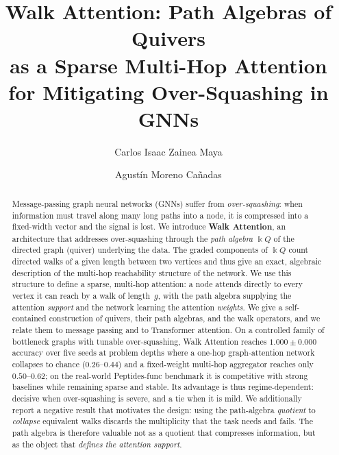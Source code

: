 \documentclass[runningheads]{llncs}
\newcommand{\kk}{\Bbbk}                 %
\newcommand{\kQ}{\kk Q}                 %
\begin{document}
\title{Walk Attention: Path Algebras of Quivers\\ as a Sparse Multi-Hop Attention\\ for Mitigating Over-Squashing in GNNs}

\author{Carlos Isaac Zainea Maya \and
Agust\'in Moreno Ca\~nadas}

\maketitle

\begin{abstract}
Message-passing graph neural networks (GNNs) suffer from \emph{over-squashing}:
when information must travel along many long paths into a node, it is compressed
into a fixed-width vector and the signal is lost. We introduce \textbf{Walk
Attention}, an architecture that addresses over-squashing through the
\emph{path algebra} $\kQ$ of the directed graph (quiver) underlying the data.
The graded components of $\kQ$ count directed walks of a given length between
two vertices and thus give an exact, algebraic description of the multi-hop
reachability structure of the network. We use this structure to define a sparse,
multi-hop attention: a node attends directly to every vertex it can reach by a
walk of length~$g$, with the path algebra supplying the attention \emph{support}
and the network learning the attention \emph{weights}. We give a self-contained
construction of quivers, their path algebras, and the walk operators, and we
relate them to message passing and to Transformer attention. On a controlled
family of bottleneck graphs with tunable over-squashing, Walk Attention reaches
$1.000 \pm 0.000$ accuracy over five seeds at problem depths where a one-hop
graph-attention network collapses to chance ($0.26$--$0.44$) and a
fixed-weight multi-hop aggregator reaches only $0.50$--$0.62$; on the real-world
Peptides-func benchmark it is competitive with strong baselines while remaining
sparse and stable. Its advantage is thus regime-dependent: decisive when
over-squashing is severe, and a tie when it is mild. We additionally report a
negative result that motivates the design: using the path-algebra \emph{quotient}
to \emph{collapse} equivalent walks discards the multiplicity that the task needs
and fails. The path algebra is therefore valuable not as a quotient that
compresses information, but as the object that \emph{defines the attention
support}.

\end{abstract}
\end{document}
